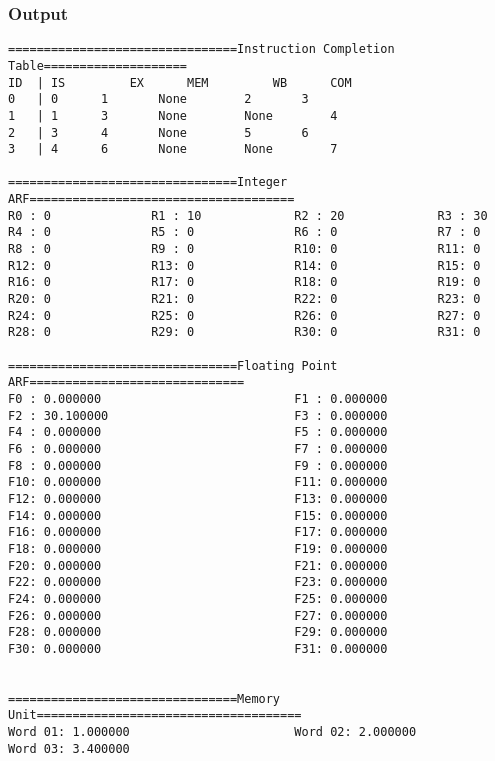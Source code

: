 \documentclass[12pt]{article}
\begin{document}
\subsubsection*{Output}
\begin{verbatim}
================================Instruction Completion Table====================
ID	| IS		 EX		 MEM		 WB		 COM
0	| 0		 1		 None		 2		 3
1	| 1		 3		 None		 None		 4
2	| 3		 4		 None		 5		 6
3	| 4		 6		 None		 None		 7

================================Integer ARF=====================================
R0 : 0              R1 : 10             R2 : 20             R3 : 30             
R4 : 0              R5 : 0              R6 : 0              R7 : 0              
R8 : 0              R9 : 0              R10: 0              R11: 0              
R12: 0              R13: 0              R14: 0              R15: 0              
R16: 0              R17: 0              R18: 0              R19: 0              
R20: 0              R21: 0              R22: 0              R23: 0              
R24: 0              R25: 0              R26: 0              R27: 0              
R28: 0              R29: 0              R30: 0              R31: 0              

================================Floating Point ARF==============================
F0 : 0.000000                           F1 : 0.000000                           
F2 : 30.100000                          F3 : 0.000000                           
F4 : 0.000000                           F5 : 0.000000                           
F6 : 0.000000                           F7 : 0.000000                           
F8 : 0.000000                           F9 : 0.000000                           
F10: 0.000000                           F11: 0.000000                           
F12: 0.000000                           F13: 0.000000                           
F14: 0.000000                           F15: 0.000000                           
F16: 0.000000                           F17: 0.000000                           
F18: 0.000000                           F19: 0.000000                           
F20: 0.000000                           F21: 0.000000                           
F22: 0.000000                           F23: 0.000000                           
F24: 0.000000                           F25: 0.000000                           
F26: 0.000000                           F27: 0.000000                           
F28: 0.000000                           F29: 0.000000                           
F30: 0.000000                           F31: 0.000000                           


================================Memory Unit=====================================
Word 01: 1.000000                       Word 02: 2.000000                       
Word 03: 3.400000  
\end{verbatim}
\end{document}
